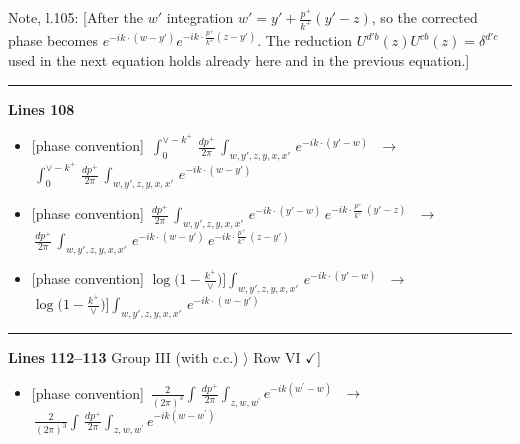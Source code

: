 \documentclass[10pt]{article}
\newenvironment{notebox}{\def\FrameCommand{{\color{notebar}\vrule width 1.5pt}\hspace{6pt}}\MakeFramed{\advance\hsize-\width\FrameRestore}\small}{\endMakeFramed}
\begin{document}
\begin{notebox}\textsf{\small Note, l.105:} [After the $w'$ integration $w'=y'+\frac{p^{+}}{k^{+}}(y'-z)$, so the corrected phase becomes $e^{-ik\cdot(w-y')}e^{-ik\cdot\frac{p^{+}}{k^{+}}(z-y')}$. The reduction $U^{d'b}(z)U^{cb}(z)=\delta^{d'c}$ used in the next equation holds already here and in the previous equation.]\end{notebox}
\noindent\rule{\linewidth}{0.3pt}\par\noindent\textbf{Lines 108} \par
\begin{itemize}[leftmargin=2.2em,itemsep=1pt,topsep=2pt]
\item[\textbf{l.108}] \textsf{\small [phase convention]} $\displaystyle \,\int_{0}^{\vee-k^{+}}\, \frac{dp^{+}}{2\pi}\, \int_{w,y',z,y,x,x'}\, e^{-ik\cdot (y'-w)}\,$\ $\longrightarrow$\ $\displaystyle \,\int_{0}^{\vee-k^{+}}\, \frac{dp^{+}}{2\pi}\, \int_{w,y',z,y,x,x'}\, e^{-ik\cdot (w-y')}\,$
\item[\textbf{l.108}] \textsf{\small [phase convention]} $\displaystyle \, \frac{dp^{+}}{2\pi}\, \int_{w,y',z,y,x,x'}\, e^{-ik\cdot (y'-w)}\, e^{-ik\cdot \frac{p^{+}}{k^{+}}\,(y'-z)}\,$\ $\longrightarrow$\ $\displaystyle \, \frac{dp^{+}}{2\pi}\, \int_{w,y',z,y,x,x'}\, e^{-ik\cdot (w-y')}\, e^{-ik\cdot \frac{p^{+}}{k^{+}}\,(z-y')}\,$
\item[\textbf{l.108}] \textsf{\small [phase convention]} $\displaystyle \log\Big(1-\frac{k^{+}}{\vee}\Big)\Big] \int_{w,y',z,y,x,x'}\, e^{-ik\cdot (y'-w)}\,$\ $\longrightarrow$\ $\displaystyle \log\Big(1-\frac{k^{+}}{\vee}\Big)\Big] \int_{w,y',z,y,x,x'}\, e^{-ik\cdot (w-y')}\,$
\end{itemize}
\noindent\rule{\linewidth}{0.3pt}\par\noindent\textbf{Lines 112--113} \quad \textsf{Group III (with c.c.) $\rangle$ Row VI { $\checkmark$]}} \par
\begin{itemize}[leftmargin=2.2em,itemsep=1pt,topsep=2pt]
\item[\textbf{l.112}] \textsf{\small [phase convention]} $\displaystyle \, \frac{2}{(2\pi)^{3}} \int\, \frac{dp^{+}}{2\pi}\int_{z,w,w^{\prime}} e^{-ik(w^{\prime}-w)}\,$\ $\longrightarrow$\ $\displaystyle \, \frac{2}{(2\pi)^{3}} \int\, \frac{dp^{+}}{2\pi}\int_{z,w,w^{\prime}} e^{-ik(w-w^{\prime})}\,$
\end{itemize}
\end{document}
